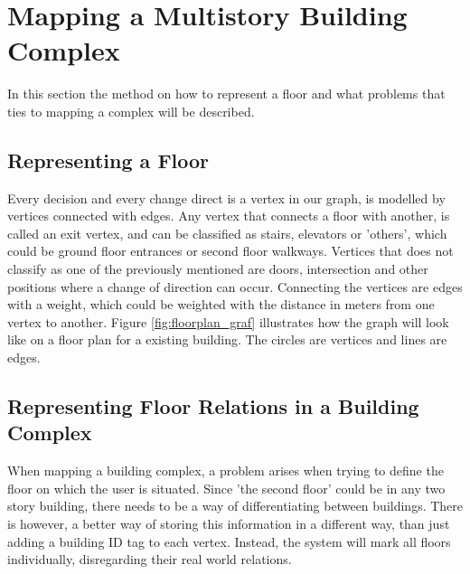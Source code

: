 
\section{Mapping a Multistory Building Complex}

In this section the method on how to represent a floor and what problems that ties to mapping a complex will be described.

\subsection{Representing a Floor}

Every decision and every change direct is a vertex in our graph, is modelled by vertices connected with edges. \label{e_vertex} Any vertex that connects a floor with another, is called an exit vertex, and can be classified as stairs, elevators or 'others', which could be ground floor entrances or second floor walkways. Vertices that does not classify as one of the previously mentioned are doors, intersection and other positions where a change of direction can occur. Connecting the vertices are edges with a weight, which could be weighted with the distance in meters from one vertex to another. Figure \ref{fig:floorplan_graf} illustrates how the graph will look like on a floor plan for a existing building. The circles are vertices and lines are edges.

\subsection{Representing Floor Relations in a Building Complex}

When mapping a building complex, a problem arises when trying to define the floor on which the user is situated. Since 'the second floor' could be in any two story building, there needs to be a way of differentiating between buildings. There is however, a better way of storing this information in a different way, than just adding a building ID tag to each vertex. Instead, the system will mark all floors individually, disregarding their real world relations.

